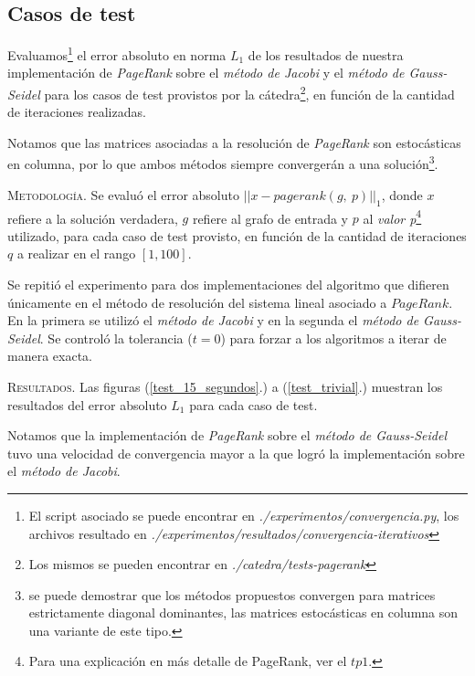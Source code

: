 \vspace{2em}
\subsection{Casos de test}

Evaluamos\footnote{El script asociado se puede encontrar en \textit{./experimentos/convergencia.py}, los archivos resultado en \textit{./experimentos/resultados/convergencia-iterativos}} el error absoluto en norma $L_1$ de los resultados de nuestra implementación de \textit{PageRank} sobre el \textit{método de Jacobi} y el \textit{método de Gauss-Seidel} para los casos de test provistos por la cátedra\footnote{Los mismos se pueden encontrar en \textit{./catedra/tests-pagerank}}, en función de la cantidad de iteraciones realizadas.

Notamos que las matrices asociadas a la resolución de \textit{PageRank} son estocásticas en columna, por lo que ambos métodos siempre convergerán a una solución\footnote{se puede demostrar que los métodos propuestos convergen para matrices estrictamente diagonal dominantes, las matrices estocásticas en columna son una variante de este tipo.}. 

\vspace{2em}
\noindent\textsc{Metodología}. Se evaluó el error absoluto $||x - pagerank(g,\ p)||_1$, donde $x$ refiere a la solución verdadera, $g$ refiere al grafo de entrada y $p$ al \textit{valor p}\footnote{Para una explicación en más detalle de PageRank, ver el $tp1$.} utilizado, para cada caso de test provisto, en función de la cantidad de iteraciones $q$ a realizar en el rango $[1, 100]$.

Se repitió el experimento para dos implementaciones del algoritmo que difieren únicamente en el método de resolución del sistema lineal asociado a $PageRank$. En la primera se utilizó el \textit{método de Jacobi} y en la segunda el \textit{método de Gauss-Seidel}. Se controló la tolerancia ($t = 0$) para forzar a los algoritmos a iterar de manera exacta. 

\vspace{2em}
\noindent\textsc{Resultados}. Las figuras (\ref{test_15_segundos}.) a (\ref{test_trivial}.) muestran los resultados del error absoluto $L_1$ para cada caso de test.

\vspace{1em}
Notamos que la implementación de \textit{PageRank} sobre el \textit{método de Gauss-Seidel} tuvo una velocidad de convergencia mayor a la que logró la implementación sobre el \textit{método de Jacobi}. 

